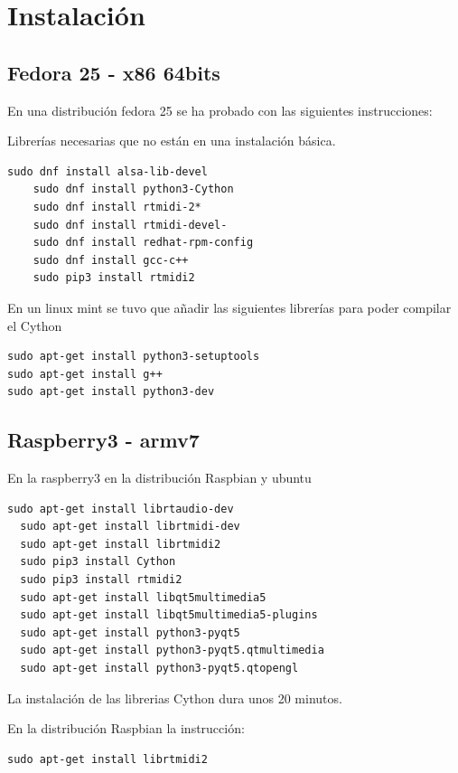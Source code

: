 \documentclass[a4paper,11pt,oneside]{book}
\begin{document}
\section{Instalación}

\subsection{Fedora 25 - x86 64bits}
En una distribución fedora 25 se ha probado con las siguientes instrucciones:

Librerías necesarias que no están en una instalación básica.

\begin{Verbatim}[frame=single]
    sudo dnf install alsa-lib-devel  
    sudo dnf install python3-Cython 
    sudo dnf install rtmidi-2*
    sudo dnf install rtmidi-devel-
    sudo dnf install redhat-rpm-config  
    sudo dnf install gcc-c++
    sudo pip3 install rtmidi2
\end{Verbatim}

En un linux mint se tuvo que añadir las siguientes librerías para poder compilar el Cython

\begin{Verbatim}[frame=single]
sudo apt-get install python3-setuptools
sudo apt-get install g++
sudo apt-get install python3-dev
\end{Verbatim}


\subsection{Raspberry3 - armv7}

En la raspberry3 en la distribución Raspbian y ubuntu

\begin{Verbatim}[frame=single]
  sudo apt-get install librtaudio-dev
  sudo apt-get install librtmidi-dev
  sudo apt-get install librtmidi2   
  sudo pip3 install Cython 
  sudo pip3 install rtmidi2
  sudo apt-get install libqt5multimedia5
  sudo apt-get install libqt5multimedia5-plugins
  sudo apt-get install python3-pyqt5
  sudo apt-get install python3-pyqt5.qtmultimedia
  sudo apt-get install python3-pyqt5.qtopengl  
\end{Verbatim}

La instalación de las librerias Cython dura unos 20 minutos.

En la distribución Raspbian la instrucción:
\begin{Verbatim}[frame=single]
  sudo apt-get install librtmidi2   
\end{Verbatim}
\end{document}
